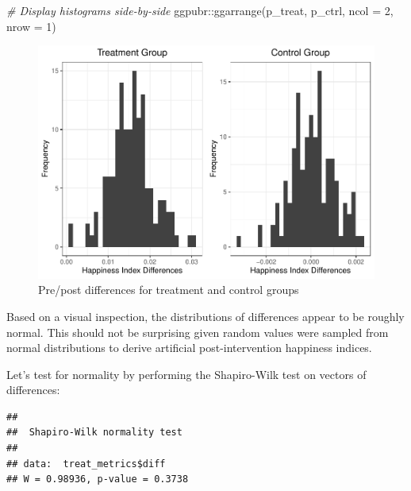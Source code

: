 \documentclass[
]{book}
\newenvironment{Shaded}{\begin{snugshade}}{\end{snugshade}}
\newcommand{\AttributeTok}[1]{\textcolor[rgb]{0.77,0.63,0.00}{#1}}
\newcommand{\CommentTok}[1]{\textcolor[rgb]{0.56,0.35,0.01}{\textit{#1}}}
\newcommand{\DecValTok}[1]{\textcolor[rgb]{0.00,0.00,0.81}{#1}}
\newcommand{\FunctionTok}[1]{\textcolor[rgb]{0.00,0.00,0.00}{#1}}
\newcommand{\NormalTok}[1]{#1}
\newcommand{\SpecialCharTok}[1]{\textcolor[rgb]{0.00,0.00,0.00}{#1}}
\begin{document}
\begin{Shaded}
\begin{Highlighting}[]
\CommentTok{\# Display histograms side{-}by{-}side}
\NormalTok{ggpubr}\SpecialCharTok{::}\FunctionTok{ggarrange}\NormalTok{(p\_treat, p\_ctrl, }\AttributeTok{ncol =} \DecValTok{2}\NormalTok{, }\AttributeTok{nrow =} \DecValTok{1}\NormalTok{)}
\end{Highlighting}
\end{Shaded}

\begin{figure}

{\centering \includegraphics{The_Fundamentals_of_People_Analytics_files/figure-latex/pre-post-diff-1} 

}

\caption{Pre/post differences for treatment and control groups}\label{fig:pre-post-diff}
\end{figure}

Based on a visual inspection, the distributions of differences appear to be roughly normal. This should not be surprising given random values were sampled from normal distributions to derive artificial post-intervention happiness indices.

Let's test for normality by performing the Shapiro-Wilk test on vectors of differences:

\begin{Shaded}
\end{Shaded}

\begin{verbatim}
## 
##  Shapiro-Wilk normality test
## 
## data:  treat_metrics$diff
## W = 0.98936, p-value = 0.3738
\end{verbatim}
\end{document}
